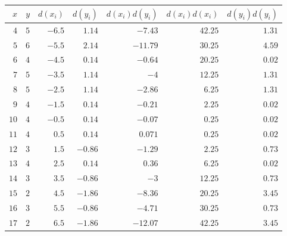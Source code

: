 \begin{tabular}{rrrrrrr}                                                              \toprule
$x$  & $y$ & $d(x_i)$ & $d(y_i)$ & $d(x_i)d(y_i)$ & $d(x_i)d(x_i)$  & $d(y_i)d(y_i)$ \\\midrule
$4$  & $5$ & $-6.5$   & $1.14$   & $-7.43$       & $42.25$         & $1.31$         \\
$5$  & $6$ & $-5.5$   & $2.14$   & $-11.79$      & $30.25$         & $4.59$         \\
$6$  & $4$ & $-4.5$   & $0.14$   & $-0.64$       & $20.25$         & $0.02$         \\
$7$  & $5$ & $-3.5$   & $1.14$   & $-4$          & $12.25$         & $1.31$         \\
$8$  & $5$ & $-2.5$   & $1.14$   & $-2.86$       & $6.25$          & $1.31$         \\
$9$  & $4$ & $-1.5$   & $0.14$   & $-0.21$       & $2.25$          & $0.02$         \\
$10$ & $4$ & $-0.5$   & $0.14$   & $-0.07$       & $0.25$          & $0.02$         \\
$11$ & $4$ & $0.5$    & $0.14$   & $0.071$       & $0.25$          & $0.02$         \\
$12$ & $3$ & $1.5$    & $-0.86$  & $-1.29$       & $2.25$          & $0.73$         \\
$13$ & $4$ & $2.5$    & $0.14$   & $0.36$        & $6.25$          & $0.02$         \\
$14$ & $3$ & $3.5$    & $-0.86$  & $-3$          & $12.25$         & $0.73$         \\
$15$ & $2$ & $4.5$    & $-1.86$  & $-8.36$       & $20.25$         & $3.45$         \\
$16$ & $3$ & $5.5$    & $-0.86$  & $-4.71$       & $30.25$         & $0.73$         \\
$17$ & $2$ & $6.5$    & $-1.86$  & $-12.07$      & $42.25$         & $3.45$         \\\bottomrule
\end{tabular}
